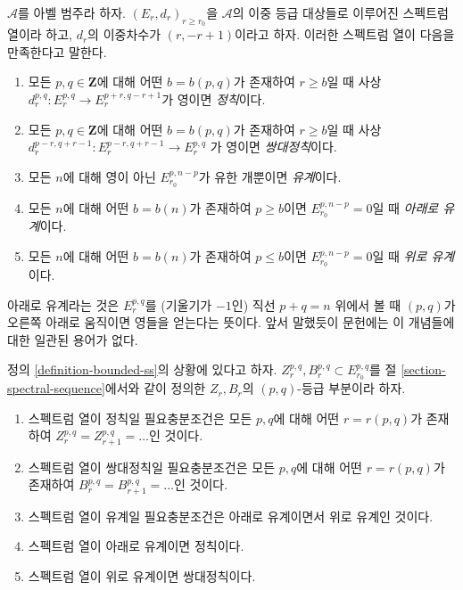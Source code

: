\begin{definition}
\label{definition-bounded-ss}
$\mathcal{A}$를 아벨 범주라 하자. $(E_r, d_r)_{r \geq r_0}$을
$\mathcal{A}$의 이중 등급 대상들로 이루어진 스펙트럼 열이라 하고,
$d_r$의 이중차수가 $(r, -r + 1)$이라고 하자. 이러한 스펙트럼 열이
다음을 만족한다고 말한다.
\begin{enumerate}
\item 모든 $p, q \in \mathbf{Z}$에 대해 어떤 $b = b(p, q)$가 존재하여
$r \geq b$일 때 사상
$d_r^{p, q} : E_r^{p, q} \to E_r^{p + r, q - r + 1}$가 영이면
{\it 정칙}이다.
\item 모든 $p, q \in \mathbf{Z}$에 대해 어떤 $b = b(p, q)$가 존재하여
$r \geq b$일 때 사상
$d_r^{p - r, q + r - 1} : E_r^{p - r, q + r - 1} \to E_r^{p, q}$
가 영이면 {\it 쌍대정칙}이다.
\item 모든 $n$에 대해 영이 아닌 $E_{r_0}^{p, n - p}$가 유한 개뿐이면
{\it 유계}이다.
\item 모든 $n$에 대해 어떤 $b = b(n)$가 존재하여 $p \geq b$이면
$E_{r_0}^{p, n - p} = 0$일 때 {\it 아래로 유계}이다.
\item 모든 $n$에 대해 어떤 $b = b(n)$가 존재하여 $p \leq b$이면
$E_{r_0}^{p, n - p} = 0$일 때 {\it 위로 유계}이다.
\end{enumerate}
\end{definition}

\noindent
아래로 유계라는 것은 $E_r^{p, q}$를 (기울기가 $-1$인) 직선
$p + q = n$ 위에서 볼 때 $(p, q)$가 오른쪽 아래로 움직이면 영들을
얻는다는 뜻이다. 앞서 말했듯이 문헌에는 이 개념들에 대한 일관된
용어가 없다.

\begin{lemma}
\label{lemma-relate-boundedness}
정의 \ref{definition-bounded-ss}의 상황에 있다고 하자.
$Z_r^{p, q}, B_r^{p, q} \subset E_{r_0}^{p, q}$를 절
\ref{section-spectral-sequence}에서와 같이 정의한 $Z_r, B_r$의
$(p, q)$-등급 부분이라 하자.
\begin{enumerate}
\item 스펙트럼 열이 정칙일 필요충분조건은 모든 $p, q$에 대해 어떤
$r = r(p, q)$가 존재하여
$Z_r^{p, q} = Z_{r + 1}^{p, q} = \ldots$인 것이다.
\item 스펙트럼 열이 쌍대정칙일 필요충분조건은 모든 $p, q$에 대해 어떤
$r = r(p, q)$가 존재하여
$B_r^{p, q} = B_{r + 1}^{p, q} = \ldots$인 것이다.
\item 스펙트럼 열이 유계일 필요충분조건은 아래로 유계이면서 위로
유계인 것이다.
\item 스펙트럼 열이 아래로 유계이면 정칙이다.
\item 스펙트럼 열이 위로 유계이면 쌍대정칙이다.
\end{enumerate}
\end{lemma}

